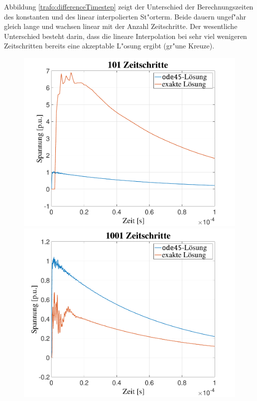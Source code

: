 \begin{refsection}
Abbildung \ref{trafo:differenceTimestep} zeigt der Unterschied der Berechnungszeiten des konstanten und des linear interpolierten St"orterm. Beide dauern ungef"ahr gleich lange und wachsen linear mit der Anzahl Zeitschritte. Der wesentliche Unterschied besteht darin, dass die lineare Interpolation bei sehr viel wenigeren Zeitschritten bereits eine akzeptable L"osung ergibt (gr"une Kreuze).
	\begin{figure}
	    \centering
	    \begin{minipage}{.32\textwidth}
	        \centering
	        \includegraphics[width=\linewidth]{./Trafo/images/Sprung101.pdf}
	    \end{minipage}%
	    \begin{minipage}{.32\textwidth}
	        \centering
	        \includegraphics[width=\linewidth]{./Trafo/images/Sprung1001.pdf}

\end{minipage}
\end{figure}
\end{refsection}

